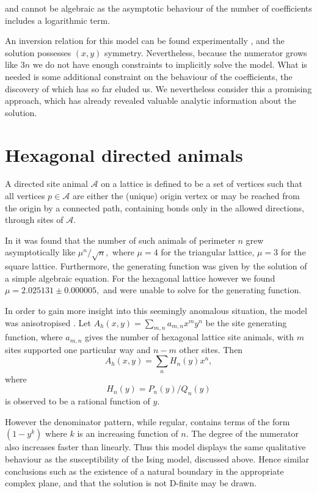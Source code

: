 and cannot be algebraic as the asymptotic behaviour of
the number of coefficients \cite{ARC97} includes a logarithmic term.

An inversion relation for this model can be found
experimentally \cite{ROG}, and the solution possesses
$(x,y)$ symmetry. Nevertheless, because the numerator
grows like $3n$ we do not have enough constraints
to implicitly solve the model. What is needed is some additional
constraint on the behaviour of the coefficients, the
discovery of which has so far eluded us. We nevertheless
consider this a promising approach, which has already
revealed valuable analytic information about the
solution.

\section{Hexagonal directed animals}
A directed site animal ${\mathcal A}$ on a lattice is defined to
be a set of
vertices such that all vertices $p \in {\mathcal A}$
are either the (unique) origin vertex or may be reached
from the origin by a connected path, containing bonds
only in the allowed directions,
through sites of ${\mathcal A}.$

In \cite{DPB,CBG} it was found that the number of such
animals of perimeter $n$
grew asymptotically like $\mu^n/\sqrt{n},$ where $\mu = 4$
for the triangular lattice, $\mu = 3$ for the square lattice.
Furthermore, the generating function was given by the
solution of a simple algebraic equation.
For the hexagonal lattice however we \cite{CBG} found
$\mu = 2.025131 \pm 0.000005,$ and were unable to solve
for the generating function.

In order to gain more insight into this seemingly anomalous
situation, the model was anisotropised \cite{ARC}. 
Let $A_h(x,y) = \sum_{m,n} a_{m,n} x^m y^n $ be the site
generating function, where $a_{m,n}$ gives the number of
hexagonal lattice site animals,  with $m$
sites supported \cite{BM98} one particular way and $n - m$ other sites. Then
$$A_h(x,y) = \sum_n H_n(y) x^n, $$ where 
$$H_n(y) = P_n(y)/Q_n(y)$$ is observed to be
a rational function of $y.$

However the denominator pattern, while regular, contains
terms of the form $(1 - y^k)$ where $k$ is an increasing
function of $n.$ The degree of the numerator also
increases faster than linearly. Thus this model displays the same
qualitative behaviour as the susceptibility of the Ising model,
discussed above. Hence similar conclusions such as
the existence of a natural boundary in the appropriate
complex plane, and that the solution is not D-finite
may be drawn.

